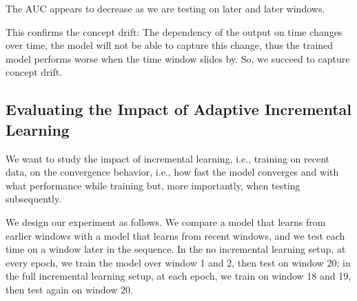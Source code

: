 The AUC appears to decrease as we are testing on later and later windows.

This confirms the concept drift: The dependency of the output on time changes over time, the model will not be able to capture this change, thus the trained model performs worse when the time window slides by. So, we succeed to capture concept drift. 

\subsection{Evaluating the Impact of Adaptive Incremental Learning}

We want to study the impact of incremental learning, i.e., training on recent data, on the convergence behavior, i.e., how fast the model converges and with what performance while training but, more importantly, when testing subsequently.

We design our experiment as follows. We compare a model that learns from earlier windows with a model that learns from recent windows, and we test each time on a window later in the sequence.
In the no incremental learning setup, at every epoch, we train the model over window 1 and 2, then test on window 20; in the full incremental learning setup, at each epoch, we train on window 18 and 19, then test again on window 20.

